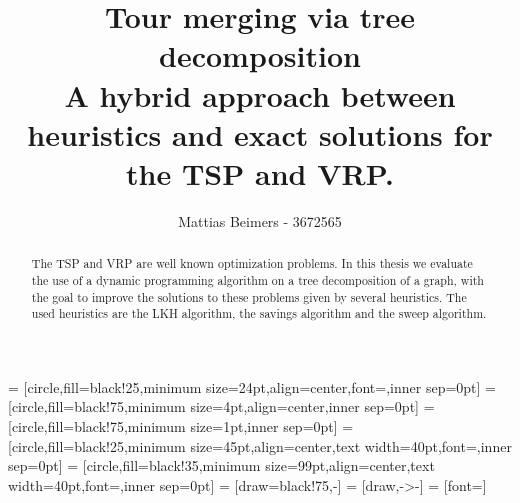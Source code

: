 \documentclass[12pt]{article}
\title{Tour merging via tree decomposition \\ \vspace{2mm} \small{A hybrid approach between
heuristics and exact solutions for the TSP and VRP.}}
\author{Mattias Beimers - 3672565}
\begin{document}
 = [circle,fill=black!25,minimum size=24pt,align=center,font=\small,inner sep=0pt]
 = [circle,fill=black!75,minimum size=4pt,align=center,inner sep=0pt]
 = [circle,fill=black!75,minimum size=1pt,inner sep=0pt]
 = [circle,fill=black!25,minimum size=45pt,align=center,text width=40pt,font=\small,inner sep=0pt]
 = [circle,fill=black!35,minimum size=99pt,align=center,text width=40pt,font=\small,inner sep=0pt]
 = [draw=black!75,-]
 = [draw,->-]
 = [font=\small]

\maketitle

%
%
%

%
%
\begin{abstract}
    The TSP and VRP are well known optimization problems.
    In this thesis we evaluate the use of a dynamic programming algorithm on a tree decomposition of a
    graph, with the goal to improve the solutions to these problems given by several heuristics. The
    used heuristics are the LKH algorithm, the savings algorithm and the sweep algorithm.
\end{abstract}



%
%
\end{document}
